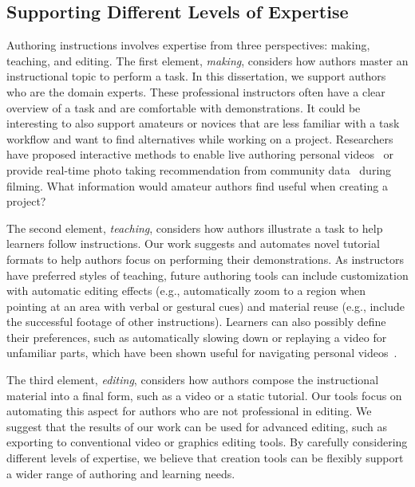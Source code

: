 \subsection{Supporting Different Levels of Expertise}
Authoring instructions involves expertise from three perspectives: making, teaching, and editing.
%
The first element, \emph{making}, considers how authors master an instructional topic to perform a task. In this dissertation, we support authors who are the domain experts. These professional instructors often have a clear overview of a task and are comfortable with demonstrations. It could be interesting to also support amateurs or novices that are less familiar with a task workflow and want to find alternatives while working on a project. Researchers have proposed interactive methods to enable live authoring personal videos~\cite{Freeman:2014:LLA:2611105.2557304} or provide real-time photo taking recommendation from community data~\cite{Bourke:2011:SCC:1943403.1943408} during filming. What information would amateur authors find useful when creating a project?

The second element, \emph{teaching}, considers how authors illustrate a task to help learners follow instructions. Our work suggests and automates novel tutorial formats to help authors focus on performing their demonstrations. As instructors have preferred styles of teaching, future authoring tools can include customization with automatic editing effects (e.g., automatically zoom to a region when pointing at an area with verbal or gestural cues) and material reuse (e.g., include the successful footage of other instructions). Learners can also possibly define their preferences, such as automatically slowing down or replaying a video for unfamiliar parts, which have been shown useful for navigating personal videos~\cite{Cheng:2009:SUV:1518701.1518823}.

The third element, \emph{editing}, considers how authors compose the instructional material into a final form, such as a video or a static tutorial. Our tools focus on automating this aspect for authors who are not professional in editing. We suggest that the results of our work can be used for advanced editing, such as exporting to conventional video or graphics editing tools.
%
By carefully considering different levels of expertise, we believe that creation tools can be flexibly support a wider range of authoring and learning needs.


